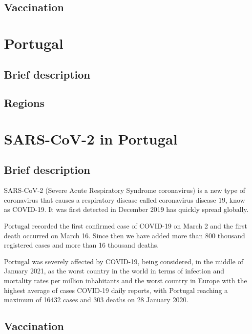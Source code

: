 \documentclass[11pt,a4paper]{report}
\begin{document}


\subsection{Vaccination}



\section{Portugal}

\subsection{Brief description}


\subsection{Regions}


\section{SARS-CoV-2 in Portugal}
\subsection{Brief description}

SARS-CoV-2 (Severe Acute Respiratory Syndrome coronavirus) is a new type of coronavirus that causes a respiratory disease called coronavirus disease 19, know as COVID-19. It was first detected in December 2019 has quickly spread globally.

Portugal recorded the first confirmed case of COVID-19 on March 2 and the first death occurred
on March 16. Since then we have added more than 800 thousand registered cases and more than 16 thousand deaths.

Portugal was severely affected by COVID-19, being considered, in the middle of January 2021, as the worst country in the world in terms of infection and mortality rates per million inhabitants and the worst country in Europe with the highest average of cases COVID-19 daily reports, with Portugal reaching a maximum of 16432 cases and 303 deaths on 28 January 2020.












\subsection{Vaccination}
\end{document}
